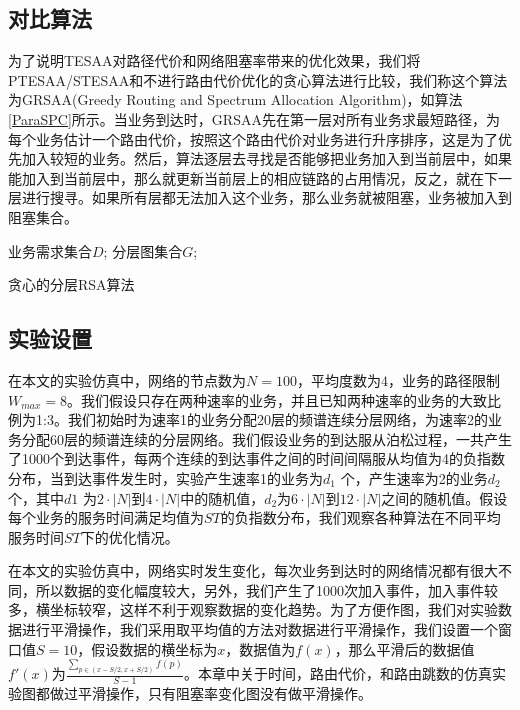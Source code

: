 \subsection{对比算法}
为了说明TESAA对路径代价和网络阻塞率带来的优化效果，我们将PTESAA/STESAA和不进行路由代价优化的贪心算法进行比较，我们称这个算法为GRSAA(Greedy Routing and Spectrum Allocation Algorithm)，如算法\ref{ParaSPC}所示。当业务到达时，GRSAA先在第一层对所有业务求最短路径，为每个业务估计一个路由代价，按照这个路由代价对业务进行升序排序，这是为了优先加入较短的业务。然后，算法逐层去寻找是否能够把业务加入到当前层中，如果能加入到当前层中，那么就更新当前层上的相应链路的占用情况，反之，就在下一层进行搜寻。如果所有层都无法加入这个业务，那么业务就被阻塞，业务被加入到阻塞集合。
\begin{algorithm}[t]
\begin{algorithmic}[1]
\Require
业务需求集合$D$;
分层图集合$G$;
\EndIf
\EndFor
{}
\EndIf
\EndFor
\EndFor
\EndFor
\end{algorithmic}
\caption{{贪心的分层RSA算法}}
\label{ParaSPC}
\end{algorithm}
\subsection{实验设置}
在本文的实验仿真中，网络的节点数为$N=100$，平均度数为$4$，业务的路径限制$W_{max}=8$。我们假设只存在两种速率的业务，并且已知两种速率的业务的大致比例为1:3。我们初始时为速率1的业务分配20层的频谱连续分层网络，为速率2的业务分配60层的频谱连续的分层网络。我们假设业务的到达服从泊松过程，一共产生了1000个到达事件，每两个连续的到达事件之间的时间间隔服从均值为4的负指数分布，当到达事件发生时，实验产生速率1的业务为$d_1$ 个，产生速率为2的业务$d_2$ 个，其中$d1$ 为$2 \cdot |N|$到$4 \cdot|N|$中的随机值，$d_2$为$6 \cdot |N|$到$12 \cdot |N|$之间的随机值。假设每个业务的服务时间满足均值为$ST$的负指数分布，我们观察各种算法在不同平均服务时间$ST$下的优化情况。

在本文的实验仿真中，网络实时发生变化，每次业务到达时的网络情况都有很大不同，所以数据的变化幅度较大，另外，我们产生了1000次加入事件，加入事件较多，横坐标较窄，这样不利于观察数据的变化趋势。为了方便作图，我们对实验数据进行平滑操作，我们采用取平均值的方法对数据进行平滑操作，我们设置一个窗口值$S=10$，假设数据的横坐标为$x$，数据值为$f(x)$，那么平滑后的数据值$f' \left( x \right)$为$\frac{\sum\limits_{p \in (x-S/2,x+S/2)}{f(p)}}{S-1}$。本章中关于时间，路由代价，和路由跳数的仿真实验图都做过平滑操作，只有阻塞率变化图没有做平滑操作。

